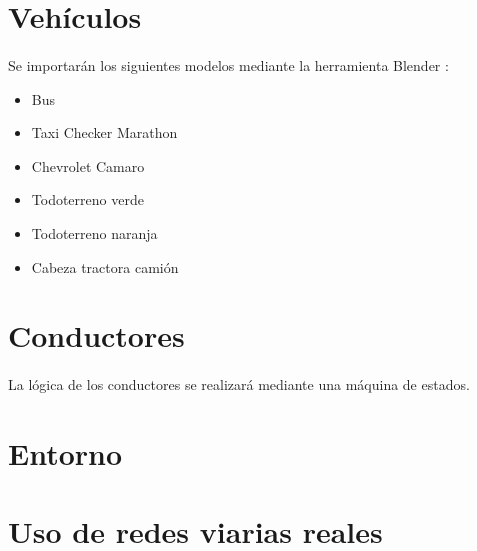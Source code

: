 \section{Vehículos}
	
	\paragraph{}
	Se importarán los siguientes modelos mediante la herramienta Blender \cite{Blender_web}:
	\begin{itemize}
		\item Bus
		\item Taxi Checker Marathon
		\item Chevrolet Camaro
		\item Todoterreno verde
		\item Todoterreno naranja
		\item Cabeza tractora camión
	\end{itemize}
	
\section{Conductores}

	\paragraph{}
	La lógica de los conductores se realizará mediante una máquina de estados.
	
\section{Entorno}

	\paragraph{}
	
\section{Uso de redes viarias reales}

	\paragraph{}
	